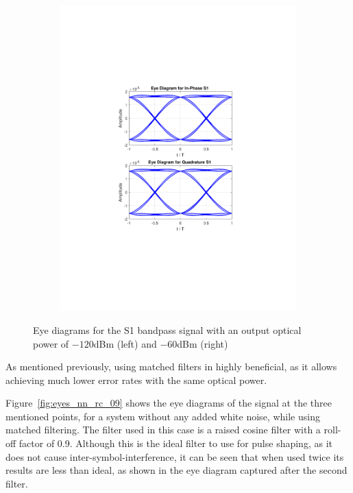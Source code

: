 \begin{figure}[H]
\begin{subfigure}{.5\textwidth}
		\includegraphics[clip, trim=5cm 7cm 5cm 7cm,
			width=\textwidth]{./sdf/m_qam_system/figures/eye60db09ro.pdf}
	\end{subfigure}
	\caption{Eye diagrams for the S1 bandpass signal with an output optical power
		of $-120$dBm (left) and $-60$dBm (right)}
	\label{fig:eyespower}
\end{figure}

As mentioned previously, using matched filters in highly beneficial, as it
allows achieving much lower error rates with the same optical power.

Figure~\ref{fig:eyes_nn_rc_09} shows the eye diagrams of the signal at the
three mentioned points, for a system without any added white noise, while using
matched filtering. The filter used in this case is a raised cosine filter with
a roll-off factor of 0.9. Although this is the ideal filter to use for pulse
shaping, as it does not cause inter-symbol-interference, it can be seen that
when used twice its results are less than ideal, as shown in the eye diagram
captured after the second filter.

